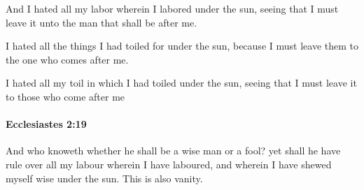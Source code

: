 			\begin{versebox}
					\item[BHS] 
					\item[LXX] 
					\item[ASV] And I hated all my labor wherein I labored under the sun, seeing that I must leave it unto the man that shall be after me.
					\item[NIV] I hated all the things I had toiled for under the sun, because I must leave them to the one who comes after me.
					\item[NRSV] I hated all my toil in which I had toiled under the sun, seeing that I must leave it to those who come after me
			\end{versebox}

		\paragraph{Ecclesiastes 2:19} %
			\label{ECCLESIASTES-2-19}

			And who knoweth whether he shall be a wise man or a fool? yet shall he have rule over all my labour wherein I have laboured, and wherein I have shewed myself wise under the sun. This is also vanity.


